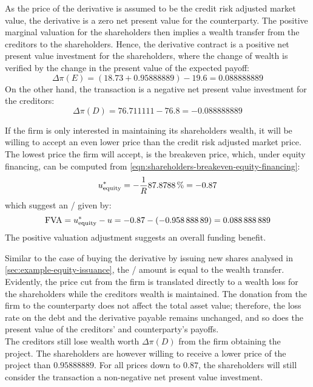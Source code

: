 \documentclass[main.tex]{subfiles}
\begin{document}
            As the price of the derivative is assumed to be the credit risk adjusted market value,
            the derivative is a zero net present value for the counterparty.
            The positive marginal valuation for the shareholders then implies a wealth transfer from the creditors to the shareholders.
            Hence, the derivative contract is a positive net present value investment for the shareholders, 
            where the change of wealth is verified by the change in the present value of the expected payoff:
            \begin{equation}
                \Delta \pi(E) = (\num{18.73} + \num{0.95888889}) - \num{19.6} = \num{0.088888889}
            \end{equation}
            On the other hand, the transaction is a negative net present value investment for the creditors:
            \begin{equation}
                \Delta \pi(D) = \num{76.711111} - \num{76.8} = \num{-0.088888889}
            \end{equation}

            If the firm is only interested in maintaining its shareholders wealth,
            it will be willing to accept an even lower price than the credit risk adjusted market price.
            The lowest price the firm will accept, is the breakeven price,
            which, under equity financing, can be computed from 
            \cref{eqn:shareholders-breakeven-equity-financing}:
            \begin{equation}
                u_{\text{equity}}^{\ast} =
                - \discountfactor
                \pct{0.878788}
                = \num{-0.87}
            \end{equation}
            which suggest an \FVA/ given by:
            \begin{equation}
                \FVA/ =
                u_{\text{equity}}^{\ast} - u =
                \num{-0.87} - \left(\num{-0.95888889}\right) =
                \num{0.088888889}
            \end{equation}
            The positive valuation adjustment suggests an overall funding benefit.
            
            Similar to the case of buying the derivative by issuing new shares analysed in \cref{sec:example-equity-issuance},
            the \FVA/ amount is equal to the wealth transfer.
            Evidently, the price cut from the firm is translated directly to a wealth loss
            for the shareholders while the creditors wealth is maintained. 
            The donation from the firm to the counterparty does not affect the total asset value;
            therefore, the loss rate on the debt and the derivative payable remains unchanged,
            and so does the present value of the creditors' and counterparty's payoffs.
            \\
            The creditors still lose wealth worth $\Delta \pi(D)$ from the firm obtaining the project.
            The shareholders are however willing to receive a lower price of the project than $\num{0.95888889}$.
            For all prices down to $\num{0.87}$,
            the shareholders will still consider the transaction a non-negative net present value investment.
\end{document}
